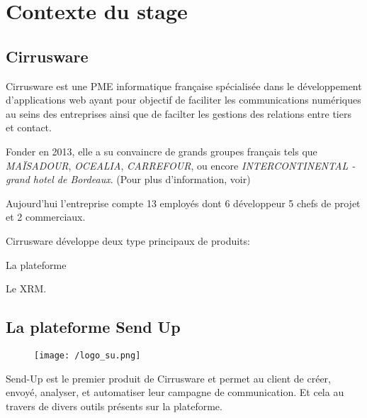\section{Contexte du stage}
\subsection{Cirrusware}
Cirrusware est une PME informatique française spécialisée dans le développement d'applications web ayant pour objectif de faciliter les communications numériques au seins des entreprises ainsi que de facilter les gestions des relations entre tiers et contact. 

Fonder en 2013, elle a su convaincre de grands groupes français tels que \textit{MAÏSADOUR}, \textit{OCEALIA}, \textit{CARREFOUR}, ou encore \textit{INTERCONTINENTAL - grand hotel de Bordeaux}. (Pour plus d'information, voir) 

Aujourd'hui l'entreprise compte 13 employés dont 6 développeur 5 chefs de projet et 2 commerciaux. 


Cirrusware développe deux type principaux de produits: 
\begin{list}{}{}
    \item La plateforme \cite{sendup}
    \item Le XRM. 
\end{list}

\subsection{La plateforme Send Up}
\begin{figure}[!h]
\centering
    \texttt{[image: /logo\_su.png]}

\end{figure}
Send-Up est le premier produit de Cirrusware et permet au client de  créer, envoyé, analyser, et automatiser leur campagne de communication. Et cela au travers de divers outils présents sur la plateforme.


